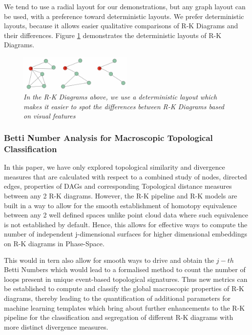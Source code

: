 We tend to use a radial layout for our demonstrations, but any graph layout can be used, with a preference toward deterministic layouts. We prefer deterministic layouts, because it allows easier qualitative comparisons of R-K Diagrams and their differences. Figure \ref{fig:layouts} demonstrates the deterministic layouts of R-K Diagrams. 

\begin{figure}[H]
	\centering
        \includegraphics[width=0.5\textwidth]{images/rk-diagram-layouts.png}
	\caption{\textit{In the R-K Diagrams above, we use a deterministic layout which makes it easier to spot the differences between R-K Diagrams based on visual features}}
	\label{fig:layouts}
\end{figure}

\subsubsection{Betti Number Analysis for Macroscopic Topological Classification}
\label{sec:BettiNumber}
In this paper, we have only explored topological similarity and divergence measures that are calculated with respect to a combined study of nodes, directed edges, properties of DAGs and corresponding Topological distance measures between any 2 R-K diagrams. However, the R-K pipeline and R-K models are built in a way to allow for the smooth establishment of homotopy equivalence between any 2 well defined spaces unlike point cloud data where such equivalence is not established by default. Hence, this allows for effective ways to compute the number of independent j-dimensional surfaces for higher dimensional embeddings on R-K diagrams in Phase-Space. 

This would in tern also allow for smooth ways to drive and obtain the $j-th$ Betti Numbers which would lead to a formalised method to count the number of loops present in unique event-based topological signatures. Thus new metrics can be established to compute and classify the global macroscopic properties of R-K diagrams, thereby leading to the quantification of additional parameters for machine learning templates which bring about further enhancements to the R-K pipeline for the classification and segregation of different R-K diagrams with more distinct divergence measures.
 
